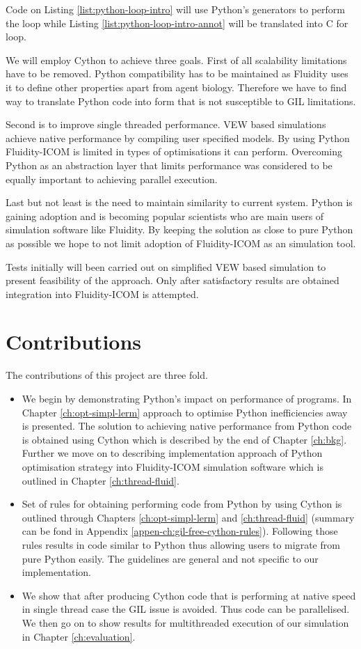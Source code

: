 \documentclass[12pt, a4paper]{report}
\begin{document}
Code on Listing \ref{list:python-loop-intro} will use Python's generators
to perform the loop while Listing \ref{list:python-loop-intro-annot} will
be translated into C for loop.

We will employ Cython to achieve three goals.
First of all scalability limitations have to be removed. Python compatibility
has to be maintained as Fluidity uses it to define other properties apart from
agent biology. Therefore we have to find way to translate Python code into
form that is not susceptible to GIL limitations.

Second is to improve single threaded performance. VEW based simulations achieve
native performance by compiling user specified models. By using Python
Fluidity-ICOM is limited in types of optimisations it can perform. Overcoming
Python as an abstraction layer that limits performance was considered to be
equally important to achieving parallel execution.

Last but not least is the need to maintain similarity to current system.
Python is gaining adoption and is becoming popular scientists who are
main users of simulation software like Fluidity. By keeping the solution
as close to pure Python as possible we hope to not limit adoption of
Fluidity-ICOM as an simulation tool.

Tests initially will been carried out on simplified VEW based simulation
to present feasibility of the approach. Only after satisfactory results
are obtained integration into Fluidity-ICOM is attempted.

\section{Contributions}\label{sec:intro-contrib}
The contributions of this project are three fold.
\begin{itemize}
  \item We begin by demonstrating Python's impact on performance
    of programs. In Chapter \ref{ch:opt-simpl-lerm} approach to
    optimise Python inefficiencies away is presented. The solution to
    achieving native performance from Python code is obtained using
    Cython which is described by the end of Chapter \ref{ch:bkg}.
    Further we move on to describing implementation approach of
    Python optimisation strategy into Fluidity-ICOM
    simulation software which is outlined in Chapter \ref{ch:thread-fluid}.
  \item Set of rules for obtaining performing code from Python by
    using Cython is outlined through Chapters \ref{ch:opt-simpl-lerm} and
    \ref{ch:thread-fluid} (summary can be fond in Appendix
    \ref{appen-ch:gil-free-cython-rules}). Following those rules results in code
    similar to Python thus allowing users to migrate from pure Python easily.
    The guidelines are general and not specific to our implementation.
  \item We show that after producing Cython code that is performing at native
    speed in single thread case the GIL issue is avoided. Thus
    code can be parallelised. We then go on to show results for multithreaded
    execution of our simulation in Chapter \ref{ch:evaluation}.
\end{itemize}
\end{document}
